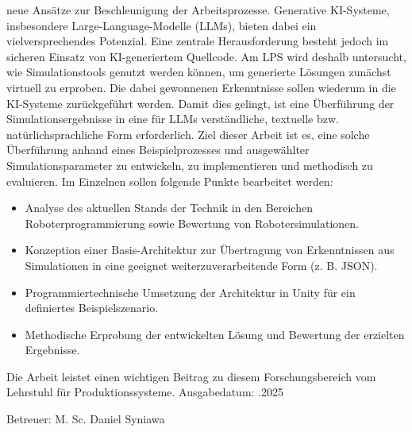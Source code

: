 \begin{titlepage}
  neue Ansätze zur Beschleunigung der Arbeitsprozesse. Generative
  KI-Systeme, insbesondere Large-Language-Modelle (LLMs), bieten
  dabei ein vielversprechendes Potenzial.
  Eine zentrale Herausforderung besteht jedoch im sicheren Einsatz
  von KI-generiertem Quellcode. Am LPS wird deshalb untersucht, wie
  Simulationstools genutzt werden können, um generierte Lösungen
  zunächst virtuell zu erproben. Die dabei gewonnenen Erkenntnisse
  sollen wiederum in die KI-Systeme zurückgeführt werden. Damit dies
  gelingt, ist eine Überführung der Simulationsergebnisse in eine für
  LLMs verständliche, textuelle bzw. natürlichsprachliche Form erforderlich.
  \bigbreak
  Ziel dieser Arbeit ist es, eine solche Überführung anhand eines
  Beispielprozesses und ausgewählter Simulationsparameter zu
  entwickeln, zu implementieren und methodisch zu evaluieren.
  \bigbreak
  Im Einzelnen sollen folgende Punkte bearbeitet werden:
  \begin{itemize}
    \item Analyse des aktuellen Stands der Technik in den Bereichen
      Roboterprogrammierung sowie Bewertung von Robotersimulationen.
    \item Konzeption einer Basis-Architektur zur Übertragung von
      Erkenntnissen aus Simulationen in eine geeignet
      weiterzuverarbeitende Form (z. B. JSON).
    \item Programmiertechnische Umsetzung der Architektur in Unity
      für ein definiertes Beispielszenario.
    \item Methodische Erprobung der entwickelten Lösung und Bewertung
      der erzielten Ergebnisse.
  \end{itemize}
  \bigbreak
  Die Arbeit leistet einen wichtigen Beitrag zu diesem Forschungsbereich vom
  Lehrstuhl für Produktionssysteme.
  \bigbreak
  Ausgabedatum: .2025\par
  Betreuer: M. Sc. Daniel Syniawa

\end{titlepage}
